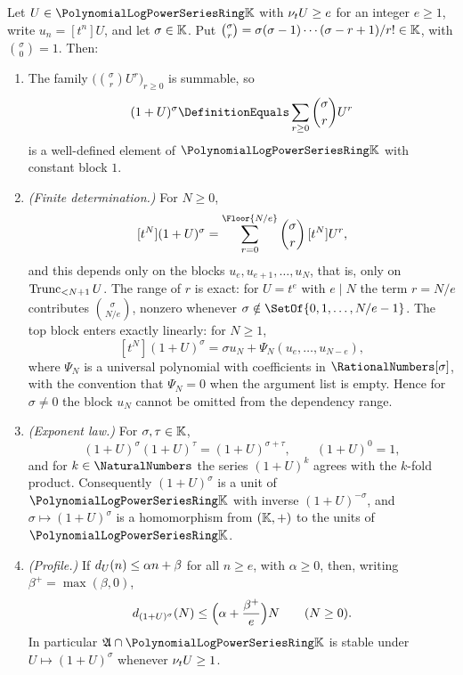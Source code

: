 \begin{theorem}
\label{plt:thm:mul-binomial}
Let $U\in\PLpow$ with $\ordt U\ge e$ for an integer $e\ge1$, write
$u_n=[t^n]U$, and let $\sigma\in\K$.  Put
$\binom{\sigma}{r}=\sigma(\sigma-1)\cdots(\sigma-r+1)/r!\in\K$, with
$\binom{\sigma}{0}=1$.  Then:
\begin{enumerate}
\item The family $\bigl(\binom{\sigma}{r}U^r\bigr)_{r\ge0}$ is summable, so
\begin{equation}\label{plt:eq:mul-binomial-def}
 (1+U)^\sigma\DefinitionEquals\sum_{r\ge0}\binom{\sigma}{r}U^r
\end{equation}
is a well-defined element of $\PLpow$ with constant block $1$.
\item \emph{(Finite determination.)}  For $N\ge0$,
\begin{equation}\label{plt:eq:mul-binomial-finite}
 [t^N](1+U)^\sigma
 =\sum_{r=0}^{\Floor{N/e}}\binom{\sigma}{r}\,[t^N]U^r,
\end{equation}
and this depends only on the blocks $u_e,u_{e+1},\ldots,u_N$, that is, only
on $\Trunc{U}{N+1}$.  The range of $r$ is exact: for $U=t^e$ with $e\mid N$
the term $r=N/e$ contributes $\binom{\sigma}{N/e}$, nonzero whenever
$\sigma\notin\SetOf{0,1,\ldots,N/e-1}$.  The top block enters exactly
linearly: for $N\ge1$,
\begin{equation}\label{plt:eq:mul-binomial-top}
 [t^N](1+U)^\sigma=\sigma u_N+\Psi_N(u_e,\ldots,u_{N-e}),
\end{equation}
where $\Psi_N$ is a universal polynomial with coefficients in
$\RationalNumbers[\sigma]$, with the convention that $\Psi_N=0$ when the
argument list is empty.  Hence for $\sigma\ne0$ the block $u_N$ cannot be
omitted from the dependency range.
\item \emph{(Exponent law.)}  For $\sigma,\tau\in\K$,
\begin{equation}\label{plt:eq:mul-binomial-group}
 (1+U)^\sigma(1+U)^\tau=(1+U)^{\sigma+\tau},
 \qquad (1+U)^0=1,
\end{equation}
and for $k\in\NaturalNumbers$ the series $(1+U)^k$ agrees with the $k$-fold
product.  Consequently $(1+U)^\sigma$ is a unit of $\PLpow$ with inverse
$(1+U)^{-\sigma}$, and $\sigma\mapsto(1+U)^\sigma$ is a homomorphism from
$(\K,+)$ to the units of $\PLpow$.
\item \emph{(Profile.)}  If $\dprofile{U}(n)\le\alpha n+\beta$ for all
$n\ge e$, with $\alpha\ge0$, then, writing $\beta^+=\max(\beta,0)$,
\begin{equation}\label{plt:eq:mul-binomial-profile}
 \dprofile{(1+U)^\sigma}(N)\le\Bigl(\alpha+\frac{\beta^+}{e}\Bigr)N
 \qquad(N\ge0).
\end{equation}
In particular $\mathfrak A\cap\PLpow$ is stable under
$U\mapsto(1+U)^\sigma$ whenever $\ordt U\ge1$.
\end{enumerate}
\end{theorem}

